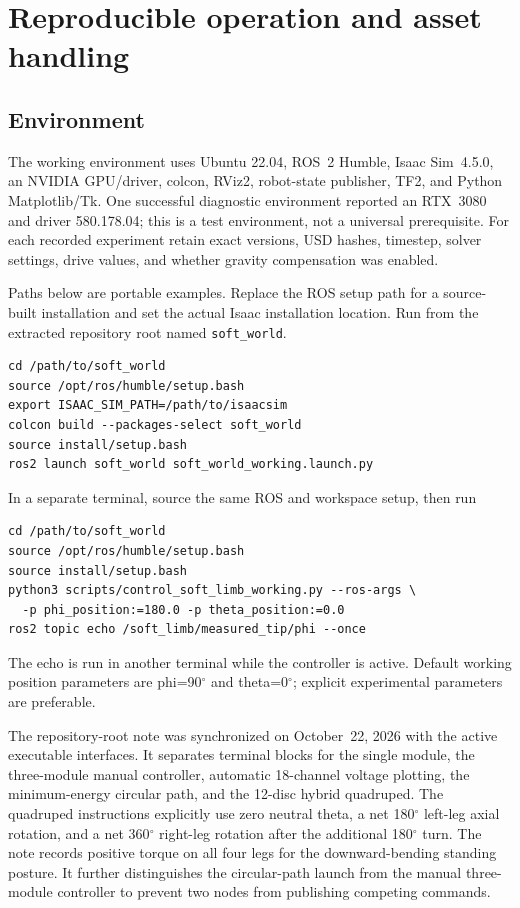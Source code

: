 \documentclass[11pt,letterpaper]{article}
\newcommand{\degrees}{\ensuremath{^{\circ}}}
\begin{document}
\section{Reproducible operation and asset handling}
\subsection{Environment}
The working environment uses Ubuntu 22.04, ROS~2 Humble, Isaac Sim~4.5.0,
an NVIDIA GPU/driver, colcon, RViz2, robot-state publisher, TF2, and Python
Matplotlib/Tk. One successful diagnostic environment reported an RTX~3080 and
driver 580.178.04; this is a test environment, not a universal prerequisite.
For each recorded experiment retain exact versions, USD hashes, timestep,
solver settings, drive values, and whether gravity compensation was enabled.

Paths below are portable examples. Replace the ROS setup path for a
source-built installation and set the actual Isaac installation location.
Run from the extracted repository root named \texttt{soft\_world}.
\begin{lstlisting}
cd /path/to/soft_world
source /opt/ros/humble/setup.bash
export ISAAC_SIM_PATH=/path/to/isaacsim
colcon build --packages-select soft_world
source install/setup.bash
ros2 launch soft_world soft_world_working.launch.py
\end{lstlisting}
In a separate terminal, source the same ROS and workspace setup, then run
\begin{lstlisting}
cd /path/to/soft_world
source /opt/ros/humble/setup.bash
source install/setup.bash
python3 scripts/control_soft_limb_working.py --ros-args \
  -p phi_position:=180.0 -p theta_position:=0.0
ros2 topic echo /soft_limb/measured_tip/phi --once
\end{lstlisting}
The echo is run in another terminal while the controller is active. Default
working position parameters are phi=90\degrees{} and theta=0\degrees{};
explicit experimental parameters are preferable.

The repository-root note  was synchronized on
October~22, 2026 with the active executable interfaces. It separates terminal
blocks for the single module, the three-module manual controller, automatic
18-channel voltage plotting, the minimum-energy circular path, and the
12-disc hybrid quadruped. The quadruped instructions explicitly use zero
neutral theta, a net 180\degrees{} left-leg axial rotation, and a net
360\degrees{} right-leg rotation after the additional 180\degrees{} turn. The
note records positive torque on all four legs for the downward-bending standing
posture. It further
distinguishes the circular-path launch from the manual three-module controller
to prevent two nodes from publishing competing commands.
\end{document}
